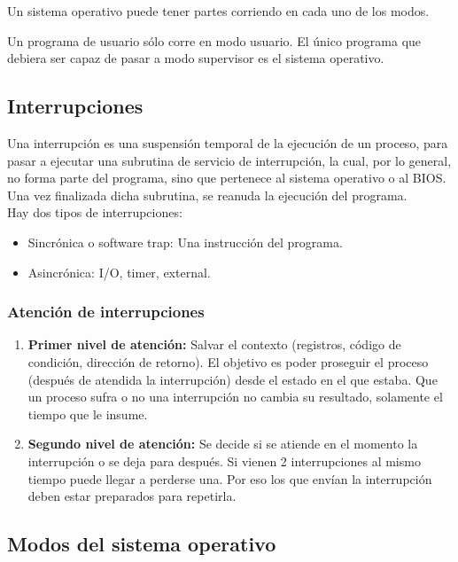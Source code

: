 \documentclass[a4paper, twoside]{article}
\begin{document}
Un sistema operativo puede tener partes corriendo en cada uno de los modos.

Un programa de usuario sólo corre en modo usuario.
El único programa que debiera ser capaz de pasar a modo supervisor es el
sistema operativo.

\subsection{Interrupciones}

Una interrupción es una suspensión temporal de la ejecución de un proceso,
para pasar a ejecutar una subrutina de servicio de interrupción, la cual,
por lo general, no forma parte del programa, sino que pertenece al sistema
operativo o al BIOS.
Una vez finalizada dicha subrutina, se reanuda la ejecución del programa.\\

Hay dos tipos de interrupciones:

\begin{itemize}
  \item Sincrónica o software trap: Una instrucción del programa.
  \item Asincrónica: I/O, timer, external.
\end{itemize}

\subsubsection{Atención de interrupciones}

\begin{enumerate}
  \item \textbf{Primer nivel de atención:} Salvar el contexto (registros,
  código de condición, dirección de retorno).
  El objetivo es poder proseguir el proceso (después de atendida la
  interrupción) desde el estado en el que estaba.
  Que un proceso sufra o no una interrupción no cambia su resultado,
  solamente el tiempo que le insume.

  \item \textbf{Segundo nivel de atención:} Se decide si se atiende en el
  momento la interrupción o se deja para después.
  Si vienen 2 interrupciones al mismo tiempo puede llegar a perderse una.
  Por eso los que envían la interrupción deben estar preparados para repetirla.
\end{enumerate}

\subsection{Modos del sistema operativo}
\end{document}
